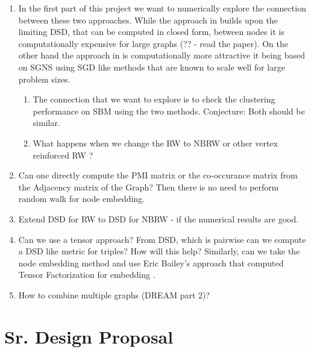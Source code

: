 \documentclass{article}
\begin{document}
\begin{enumerate}
    
    \item In the first part of this project we want to numerically explore the connection between these two approaches. While the approach in \cite{DSD} builds upon the limiting DSD, that can be computed in closed form, between nodes it is computationally expensive for large graphs (?? - read the paper). On the other hand the approach in \cite{NodeEmbed} is computationally more attractive it being based on SGNS using SGD like methods that are known to scale well for large problem sizes.
    
    \begin{enumerate}
    
        \item The connection that we want to explore is to check the clustering performance on SBM using the two methods.   Conjecture: Both should be similar. 
            
        \item What happens when we change the RW to NBRW \cite{xx} or other vertex reinforced RW \cite{xx}? 
        
    \end{enumerate}
    
    \item Can one directly compute the PMI matrix or the co-occurance matrix from the Adjacency matrix of the Graph? Then there is no need to perform random walk for node embedding. 
    
    \item Extend DSD for RW to DSD for NBRW - if the numerical results are good. 
    
    \item Can we use a tensor approach? From DSD, which is pairwise can we compute a DSD like metric for triples? How will this help? Similarly, can we take the node embedding method and use Eric Bailey's approach that computed Tensor Factorization for embedding \cite{Bailey}. 
    
    \item How to combine multiple graphs (DREAM part 2)?
    
\end{enumerate}

\section{Sr. Design Proposal}
\end{document}
